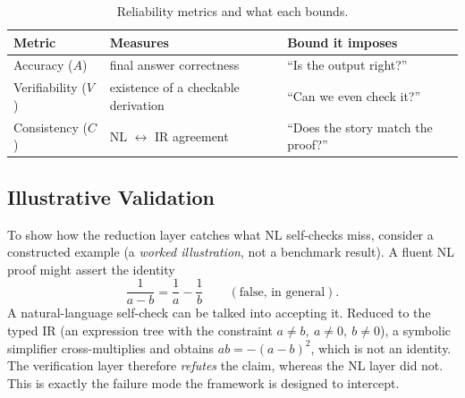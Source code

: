 \documentclass[11pt]{article}
\begin{document}
\begin{table}[t]
\centering
\caption{Reliability metrics and what each bounds.}
\label{tab:metrics}
\begin{tabular}{@{}lll@{}}
\toprule
Metric & Measures & Bound it imposes \\
\midrule
Accuracy ($A$) & final answer correctness & ``Is the output right?'' \\
Verifiability ($V$) & existence of a checkable derivation & ``Can we even check it?'' \\
Consistency ($C$) & NL $\leftrightarrow$ IR agreement & ``Does the story match the proof?'' \\
\bottomrule
\end{tabular}
\end{table}

\subsection{Illustrative Validation}
\label{sec:illustrative}
To show how the reduction layer catches what NL self-checks miss, consider a constructed
example (a \emph{worked illustration}, not a benchmark result). A fluent NL proof might
assert the identity
\begin{equation}
\frac{1}{a-b} = \frac{1}{a} - \frac{1}{b}\qquad(\text{false, in general}).
\end{equation}
A natural-language self-check can be talked into accepting it. Reduced to the typed IR
(an expression tree with the constraint $a\neq b,\ a\neq 0,\ b\neq 0$), a symbolic
simplifier cross-multiplies and obtains $ab = -(a-b)^2$, which is not an identity. The
verification layer therefore \emph{refutes} the claim, whereas the NL layer did not.
This is exactly the failure mode the framework is designed to intercept.
\end{document}
